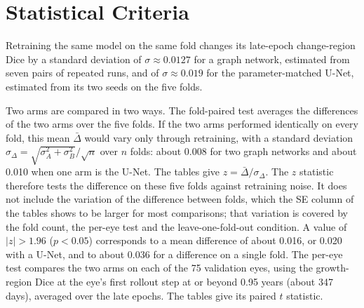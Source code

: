 
\section{Statistical Criteria}
\label{app:full-results:criteria}

Retraining the same model on the same fold changes its late-epoch
change-region Dice by a standard deviation of $\sigma \approx 0.0127$ for a
graph network, estimated from seven pairs of repeated runs, and of
$\sigma \approx 0.019$ for the parameter-matched U-Net, estimated from its
two seeds on the five folds.

Two arms are compared in two ways. The fold-paired test averages the
differences of the two arms over the five folds. If the two arms
performed identically on every fold, this mean $\bar{\Delta}$ would vary
only through retraining, with
a standard deviation $\sigma_\Delta = \sqrt{\sigma_A^2 + \sigma_B^2} /
\sqrt{n}$ over $n$ folds: about 0.008 for two graph networks and about
0.010 when one arm is the U-Net. The tables give
$z = \bar{\Delta} / \sigma_\Delta$. The $z$ statistic therefore tests the
difference on these five folds against retraining noise. It does not
include the variation of the difference between folds, which the SE column
of the tables shows to be larger for most comparisons; that variation is
covered by the fold count, the per-eye test and the leave-one-fold-out
condition. A value of $|z| > 1.96$ ($p < 0.05$)
corresponds to a mean difference of about 0.016, or 0.020 with a U-Net,
and to about 0.036 for a difference on a single fold. The per-eye test
compares the two arms on each of the 75 validation eyes, using the
growth-region Dice at the eye's first rollout step at or beyond 0.95 years
(about 347 days), averaged over the late epochs. The tables give its paired
$t$ statistic.

